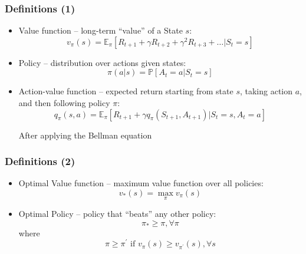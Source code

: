 \documentclass{beamer}
\begin{document}
\begin{frame}
\frametitle{Definitions (1)}
\begin{itemize}
	\item Value function -- long-term ``value'' of a State $s$:	
	$$v_{\pi}(s)=\mathbb{E}_{\pi}\left[R_{t+1}+\gamma R_{t+2}+\gamma^{2} R_{t+3}+\ldots | S_{t}=s\right]$$
	
	
	\item Policy -- distribution over actions given states:
	$$
	\pi(a | s)=\mathbb{P}\left[A_{t}=a | S_{t}=s\right]
	$$
	
	
	\item Action-value function --  expected return
	starting from state $s$, taking action $a$, 
	and then following policy $\pi$:
	$$
	q_{\pi}(s, a)=\mathbb{E}_{\pi}\left[R_{t+1}+\gamma q_{\pi}\left(S_{t+1}, A_{t+1}\right) | S_{t}=s, A_{t}=a\right]
	$$
	
	After applying the Bellman equation

\end{itemize}
\end{frame}

\begin{frame}
\frametitle{Definitions (2)}

\begin{itemize}
	
	\item Optimal Value function -- maximum value
	function over all policies:	
$$
v_{*}(s)=\max _{\pi} v_{\pi}(s)
$$


\item Optimal Policy -- policy that ``beats''
any other policy:
$$
\pi_{*} \geq \pi, \forall \pi
$$
where
$$
\pi \geq \pi^{\prime} \text { if } v_{\pi}(s) \geq v_{\pi^{\prime}}(s), \forall s
$$

\end{itemize}

\end{frame}
\end{document}
